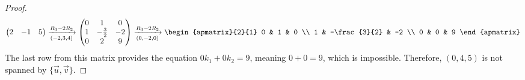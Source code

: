 \documentclass{article}
\begin{document}
\begin{enumerate}
\begin{proof}
\[\begin{pmatrix}
                2 & -1           & 5
            \end{pmatrix} \xrightarrow[(-2,3,4)]{R_3 - 2R_2}
            \begin{pmatrix}
                0 & 1            & 0  \\
                1 & -\frac{3}{2} & -2 \\
                0 & 2            & 9  \\
            \end{pmatrix} \xrightarrow[(0,-2,0)]{R_3 - 2R_2}
            \begin{apmatrix}{2}{1}
                0 & 1 & 0 \\
                1 & -\frac{3}{2} & -2 \\
                0 & 0 & 9
            \end{apmatrix}
        \]
        The last row from this matrix provides the equation $0k_1 + 0k_2 = 9$, meaning $0 + 0 = 9$, which is impossible. Therefore, $(0,4,5)$ is not spanned by $\{\vec{u}, \vec{v}\}$.
    \end{proof}
\end{enumerate}
\end{document}
